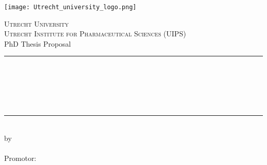 
\pagestyle{empty} %
\frontmatter %

\begin{titlepage}
\begin{center}
    \texttt{[image: Utrecht\_university\_logo.png]}

{\large \scshape Utrecht University\\Utrecht Institute for Pharmaceutical Sciences (UIPS)}\\[1.4cm]
{\Large PhD Thesis Proposal}\\[0.5cm]
\rule{\textwidth}{1.5pt}\\[0cm]
{\huge \bfseries \thesistitle \par \ }\\[-0.5cm]
\rule{\textwidth}{1.5pt}\\[2.5cm]
\hfill  by\\[1cm]
\hfill  {\large \bfseries\name}\\
\vfill
{\hfill \large Promotor: \textbf{\Promotor}} \\ 
\vspace{1cm}
\hfill  \submissiondate
\end{center}
\end{titlepage}